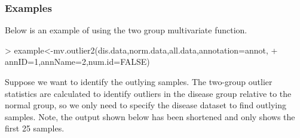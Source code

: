 \documentclass[11pt, a4paper]{article}
\begin{document}
\subsubsection{Examples}
Below is an example of using the two group multivariate function.
\begin{Schunk}
\begin{Sinput}
> example<-mv.outlier2(dis.data,norm.data,all.data,annotation=annot,
+               annID=1,annName=2,num.id=FALSE)
\end{Sinput}
\end{Schunk}
Suppose we want to identify the outlying samples. The two-group outlier statistics are calculated to identify outliers in the disease group relative to the normal group, so we only need to specify the disease dataset to find outlying samples. Note, the output shown below has been shortened and only shows the first 25 samples.
\end{document}
